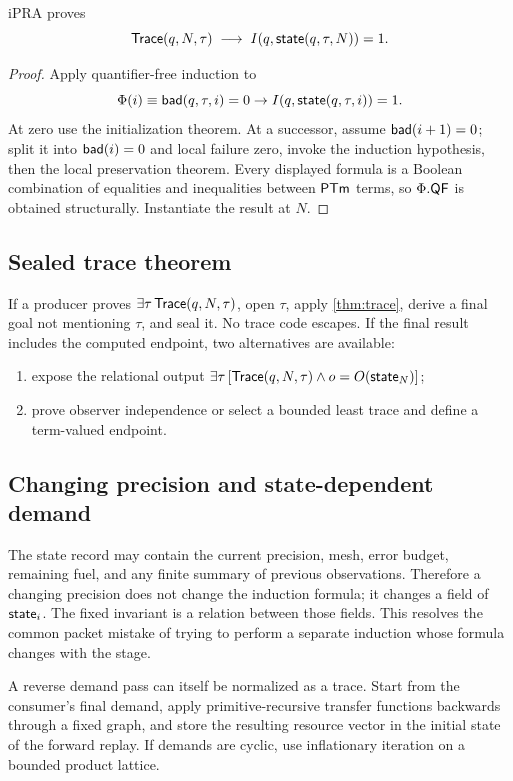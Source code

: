 \begin{theorem}
\label{thm:trace}
iPRA proves
\[
  \mathsf{Trace}(q,N,\tau)\;\longrightarrow\;
  I(q,\mathsf{state}(q,\tau,N))=1.
\]
\end{theorem}

\begin{proof}
Apply quantifier-free induction to
\[
  \Phi(i)\equiv
  \mathsf{bad}(q,\tau,i)=0\to I(q,\mathsf{state}(q,\tau,i))=1.
\]
At zero use the initialization theorem.  At a successor, assume
\(\mathsf{bad}(i+1)=0\); split it into \(\mathsf{bad}(i)=0\) and local failure zero, invoke the
induction hypothesis, then the local preservation theorem.  Every displayed
formula is a Boolean combination of equalities and inequalities between
\(\mathsf{PTm}\) terms, so \(\Phi.\mathsf{QF}\) is obtained structurally.  Instantiate the
result at \(N\).
\end{proof}

\subsection{Sealed trace theorem}

If a producer proves \(\exists\tau\,\mathsf{Trace}(q,N,\tau)\), open \(\tau\), apply
\cref{thm:trace}, derive a final goal not mentioning \(\tau\), and seal it.
No trace code escapes.  If the final result includes the computed endpoint,
two alternatives are available:
\begin{enumerate}[label=(\alph*)]
\item expose the relational output
\(\exists\tau\,[\mathsf{Trace}(q,N,\tau)\wedge o=O(\mathsf{state}_N)]\);
\item prove observer independence or select a bounded least trace and define a
      term-valued endpoint.
\end{enumerate}

\subsection{Changing precision and state-dependent demand}

The state record may contain the current precision, mesh, error budget,
remaining fuel, and any finite summary of previous observations.  Therefore a
changing precision does not change the induction formula; it changes a field
of \(\mathsf{state}_i\).  The fixed invariant is a relation between those fields.  This
resolves the common packet mistake of trying to perform a separate induction
whose formula changes with the stage.

A reverse demand pass can itself be normalized as a trace.  Start from the
consumer's final demand, apply primitive-recursive transfer functions
backwards through a fixed graph, and store the resulting resource vector in the
initial state of the forward replay.  If demands are cyclic, use inflationary
iteration on a bounded product lattice.

